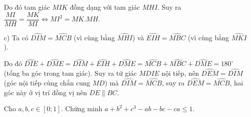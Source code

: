 \begin{ex}
{Do đó tam giác $MIK$ đồng dạng với tam giác $MHI$. Suy ra $\dfrac{MI}{MH} = \dfrac{MK}{MI} \Leftrightarrow MI^2 = MK.MH.$


c) Ta có $\widehat{DIM} =\widehat{MCB}$ (vì cùng bằng $\widehat{MHI}$) và $\widehat{EIH} = \widehat{MBC}$ (vì cùng bằng $\widehat{MKI}$). 

Do đó $\widehat{DIE} + \widehat{DME} =\widehat{DIM}+ \widehat{EIH} + \widehat{DME} = \widehat{MCB}+ \widehat{MBC}+\widehat{DME} =180^\circ$ (tổng ba góc trong tam giác).
Suy ra tứ giác $MDIE$ nội tiếp, nên $\widehat{DEM}=\widehat{DIM}$ (góc nội tiếp cùng chắn cung $MD$) mà  $\widehat{DIM} =\widehat{MCB}$, suy ra $\widehat{DEM} = \widehat{MCB} $, hai góc này ở vị trí đồng vị nên $DE \parallel BC.$
}
\end{ex}

\begin{ex}%
Cho $a,b,c \in [0;1].$ Chứng minh $a+b^2+c^3 - ab-bc-ca \le 1.$
\end{ex}



